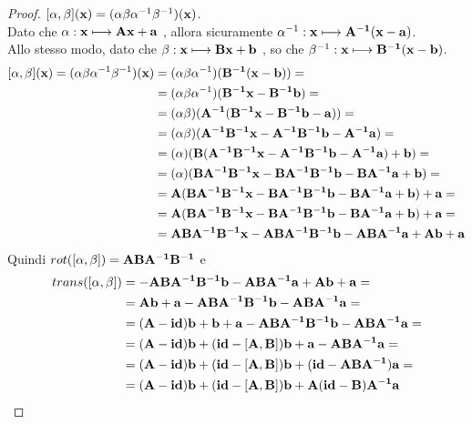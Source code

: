 \documentclass[a4paper]{book}
\begin{document}
\begin{proof}
	$ [ \alpha, \beta ](\vb{x}) = ( \alpha \beta \alpha^{-1} \beta^{-1} ) (\vb{x})$. \\
	Dato che $ \alpha : \vb{x} \longmapsto \vb{Ax + a}$ , allora sicuramente  $\alpha^{-1}: \vb{x} \longmapsto \vb{A^{-1}(x-a)}$.  \\
	Allo stesso modo, dato che $ \beta : \vb{x} \longmapsto \vb{Bx + b}$ , so che $\beta^{-1}: \vb{x} \longmapsto \vb{B^{-1}(x-b)}$. 
\begin{equation*}
\begin{split}
[ \alpha, \beta ](\vb{x}) = (\alpha \beta \alpha^{-1} \beta^{-1} ) (\vb{x})
& = (\alpha \beta \alpha^{-1})( \vb{B^{-1}(x-b)}) = \\ 
& = (\alpha \beta \alpha^{-1})( \vb{B^{-1}x- B^{-1}b }) = \\ 
& = (\alpha \beta)(\vb{A^{-1}( B^{-1}x- B^{-1}b -a)})= \\
& =  (\alpha \beta)(\vb{A^{-1} B^{-1}x- A^{-1}B^{-1}b -A^{-1}a})  = \\
& = (\alpha)(\vb{B(A^{-1} B^{-1}x- A^{-1}B^{-1}b -A^{-1}a) +b}) = \\
& = (\alpha)(\vb{BA^{-1} B^{-1}x-BA^{-1}B^{-1}b -BA^{-1}a +b}) = \\
& = \vb{A(BA^{-1} B^{-1}x-BA^{-1}B^{-1}b -BA^{-1}a +b) + a} = \\
& = \vb{A(BA^{-1} B^{-1}x-BA^{-1}B^{-1}b -BA^{-1}a +b) + a} = \\
& = \vb{ABA^{-1} B^{-1}x-ABA^{-1}B^{-1}b -ABA^{-1}a +Ab + a }
\end{split}
\end{equation*}
Quindi $ rot([ \alpha , \beta ]) = \vb{ABA^{-1} B^{-1} }$ e
\begin{equation*}
\begin{split}
trans([ \alpha, \beta ]) & = \vb{-ABA^{-1}B^{-1}b -ABA^{-1}a +Ab + a }= \\
& = \vb{Ab + a -ABA^{-1}B^{-1}b -ABA^{-1}a }= \\
& = \vb{(A-id)b + b + a -ABA^{-1}B^{-1}b -ABA^{-1}a} = \\
& = \vb{(A-id)b + (id-[A,B])b + a - ABA^{-1}a} = \\
& = \vb{(A-id)b + (id-[A,B])b + (id- ABA^{-1})a }= \\
& = \vb{(A-id)b + (id-[A,B])b + A(id- B)A^{-1}a} 
\end{split}
\end{equation*}	
\end{proof}
\end{document}
